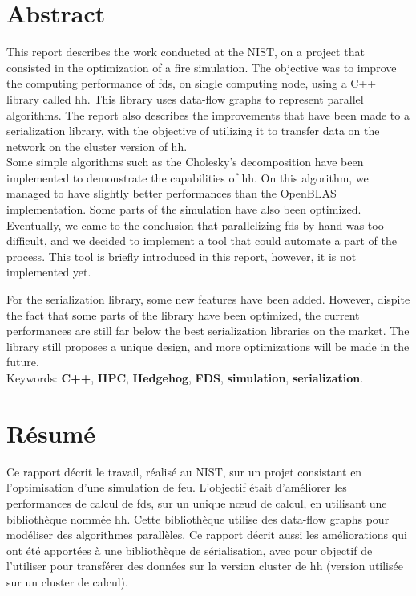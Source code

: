 
\clearpage{}
\section*{Abstract}

This report describes the work conducted at the NIST, on a project that
consisted in the optimization of a fire simulation. The objective was to improve
the computing performance of \gls{fds}, on single computing node, using a C++
library called \gls{hh}. This library uses data-flow graphs to represent
parallel algorithms. The report also describes the improvements that have been
made to a serialization library, with the objective of utilizing it to transfer
data on the network on the cluster version of \gls{hh}.\\

Some simple algorithms such as the Cholesky's decomposition have been
implemented to demonstrate the capabilities of \gls{hh}. On this algorithm, we
managed to have slightly better performances than the OpenBLAS implementation.
Some parts of the simulation have also been optimized. Eventually, we came to
the conclusion that parallelizing \gls{fds} by hand was too difficult, and we
decided to implement a tool that could automate a part of the process. This tool
is briefly introduced in this report, however, it is not implemented yet.

For the serialization library, some new features have been added. However,
dispite the fact that some parts of the library have been optimized, the current
performances are still far below the best serialization libraries on the
market. The library still proposes a unique design, and more optimizations will
be made in the future.\\

Keywords: \textbf{C++}, \textbf{HPC}, \textbf{Hedgehog}, \textbf{FDS},
\textbf{simulation}, \textbf{serialization}.

\section*{Résumé}

Ce rapport décrit le travail, réalisé au NIST, sur un projet consistant en
l'optimisation d'une simulation de feu. L'objectif était d'améliorer les
performances de calcul de \gls{fds}, sur un unique nœud de calcul, en utilisant
une bibliothèque nommée \gls{hh}. Cette bibliothèque utilise des data-flow
graphs pour modéliser des algorithmes parallèles. Ce rapport décrit aussi les
améliorations qui ont été apportées à une bibliothèque de sérialisation, avec
pour objectif de l'utiliser pour transférer des données sur la version cluster
de \gls{hh} (version utilisée sur un cluster de calcul).\\

